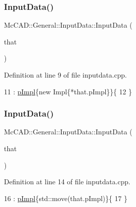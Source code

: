 \subsubsection{\texorpdfstring{Input\+Data()}{InputData()}\hspace{0.1cm}{\footnotesize\ttfamily [2/6]}}
{\footnotesize\ttfamily Mc\+C\+A\+D\+::\+General\+::\+Input\+Data\+::\+Input\+Data (\begin{DoxyParamCaption}\item[{const \hyperlink{classMcCAD_1_1General_1_1InputData}{Input\+Data} \&}]{that }\end{DoxyParamCaption})}



Definition at line 9 of file inputdata.\+cpp.


\begin{DoxyCode}
11     : \hyperlink{classMcCAD_1_1General_1_1InputData_a6a636f3d471d293dcb12c59d29af50c9}{pImpl}\{\textcolor{keyword}{new} Impl\{*that.pImpl\}\}\{
12 \}
\end{DoxyCode}
\mbox{\label{classMcCAD_1_1General_1_1InputData_a04ef329c9eb848ce855faebb88f24f89}} 
\subsubsection{\texorpdfstring{Input\+Data()}{InputData()}\hspace{0.1cm}{\footnotesize\ttfamily [3/6]}}
{\footnotesize\ttfamily Mc\+C\+A\+D\+::\+General\+::\+Input\+Data\+::\+Input\+Data (\begin{DoxyParamCaption}\item[{\hyperlink{classMcCAD_1_1General_1_1InputData}{Input\+Data} \&\&}]{that }\end{DoxyParamCaption})}



Definition at line 14 of file inputdata.\+cpp.


\begin{DoxyCode}
16     : \hyperlink{classMcCAD_1_1General_1_1InputData_a6a636f3d471d293dcb12c59d29af50c9}{pImpl}\{std::move(that.pImpl)\}\{
17 \}
\end{DoxyCode}
\mbox{\label{classMcCAD_1_1General_1_1InputData_a11156f1c907e745d408926ebb09d3dd0}} 

